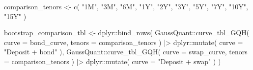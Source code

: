 \documentclass[
  letterpaper,
  DIV=11,
  numbers=noendperiod]{scrreprt}
\newenvironment{Shaded}{\begin{snugshade}}{\end{snugshade}}
\newcommand{\AttributeTok}[1]{\textcolor[rgb]{0.40,0.45,0.13}{#1}}
\newcommand{\FunctionTok}[1]{\textcolor[rgb]{0.28,0.35,0.67}{#1}}
\newcommand{\NormalTok}[1]{\textcolor[rgb]{0.00,0.23,0.31}{#1}}
\newcommand{\OtherTok}[1]{\textcolor[rgb]{0.00,0.23,0.31}{#1}}
\newcommand{\SpecialCharTok}[1]{\textcolor[rgb]{0.37,0.37,0.37}{#1}}
\newcommand{\StringTok}[1]{\textcolor[rgb]{0.13,0.47,0.30}{#1}}
\begin{document}
\begin{Shaded}
\begin{Highlighting}[]
\NormalTok{comparison\_tenors }\OtherTok{\textless{}{-}} \FunctionTok{c}\NormalTok{(}
  \StringTok{"1M"}\NormalTok{, }\StringTok{"3M"}\NormalTok{, }\StringTok{"6M"}\NormalTok{, }\StringTok{"1Y"}\NormalTok{,}
  \StringTok{"2Y"}\NormalTok{, }\StringTok{"3Y"}\NormalTok{, }\StringTok{"5Y"}\NormalTok{, }\StringTok{"7Y"}\NormalTok{,}
  \StringTok{"10Y"}\NormalTok{, }\StringTok{"15Y"}
\NormalTok{)}

\NormalTok{bootstrap\_comparison\_tbl }\OtherTok{\textless{}{-}}\NormalTok{ dplyr}\SpecialCharTok{::}\FunctionTok{bind\_rows}\NormalTok{(}
\NormalTok{  GaussQuant}\SpecialCharTok{::}\FunctionTok{curve\_tbl\_GQH}\NormalTok{(}
    \AttributeTok{curve =}\NormalTok{ bond\_curve,}
    \AttributeTok{tenors =}\NormalTok{ comparison\_tenors}
\NormalTok{  ) }\SpecialCharTok{|\textgreater{}}
\NormalTok{    dplyr}\SpecialCharTok{::}\FunctionTok{mutate}\NormalTok{(}
      \AttributeTok{curve =} \StringTok{"Deposit + bond"}
\NormalTok{    ),}
\NormalTok{  GaussQuant}\SpecialCharTok{::}\FunctionTok{curve\_tbl\_GQH}\NormalTok{(}
    \AttributeTok{curve =}\NormalTok{ swap\_curve,}
    \AttributeTok{tenors =}\NormalTok{ comparison\_tenors}
\NormalTok{  ) }\SpecialCharTok{|\textgreater{}}
\NormalTok{    dplyr}\SpecialCharTok{::}\FunctionTok{mutate}\NormalTok{(}
      \AttributeTok{curve =} \StringTok{"Deposit + swap"}
\NormalTok{    )}
\NormalTok{)}


\end{Highlighting}
\end{Shaded}
\end{document}
